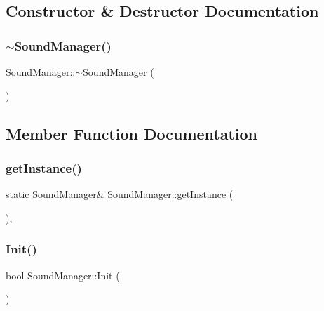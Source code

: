 \subsection{Constructor \& Destructor Documentation}
\mbox{\label{class_sound_manager_ad5dbf8eab22db48ff8f3db51b02f8938}} 
\subsubsection{\texorpdfstring{$\sim$\+Sound\+Manager()}{~SoundManager()}}
{\footnotesize\ttfamily Sound\+Manager\+::$\sim$\+Sound\+Manager (\begin{DoxyParamCaption}{ }\end{DoxyParamCaption})}



\subsection{Member Function Documentation}
\mbox{\label{class_sound_manager_a4f8f0b2d539d055f4c1de8c47d483cb3}} 
\subsubsection{\texorpdfstring{get\+Instance()}{getInstance()}}
{\footnotesize\ttfamily static \mbox{\hyperlink{class_sound_manager}{Sound\+Manager}}\& Sound\+Manager\+::get\+Instance (\begin{DoxyParamCaption}{ }\end{DoxyParamCaption})\hspace{0.3cm}{\ttfamily [inline]}, {\ttfamily [static]}}

\mbox{\label{class_sound_manager_af1ee5e29fca894a8ac9aeeb56b81f21d}} 
\subsubsection{\texorpdfstring{Init()}{Init()}}
{\footnotesize\ttfamily bool Sound\+Manager\+::\+Init (\begin{DoxyParamCaption}{ }\end{DoxyParamCaption})}



